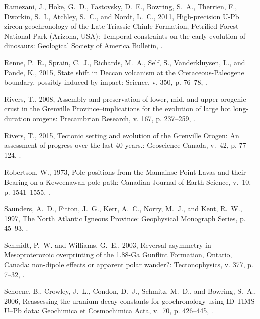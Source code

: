 \documentclass[11pt,letterpaper]{article}
\begin{document}
\begin{thebibliography}{153}
Ramezani, J., Hoke, G.~D., Fastovsky, D.~E., Bowring, S.~A., Therrien, F.,
  Dworkin, S.~I., Atchley, S.~C., and Nordt, L.~C., 2011, {High-precision U-Pb
  zircon geochronology of the Late Triassic Chinle Formation, Petrified Forest
  National Park (Arizona, USA): Temporal constraints on the early evolution of
  dinosaurs}: Geological Society of America Bulletin, .

Renne, P.~R., Sprain, C.~J., Richards, M.~A., Self, S., Vanderkluysen, L., and
  Pande, K., 2015, {State shift in Deccan volcanism at the Cretaceous-Paleogene
  boundary, possibly induced by impact}: Science, v. 350, p. 76--78,
  .

Rivers, T., 2008, Assembly and preservation of lower, mid, and upper orogenic
  crust in the {G}renville {P}rovince--implications for the evolution of large
  hot long-duration orogens: Precambrian Research, v. 167, p. 237--259,
  .

Rivers, T., 2015, Tectonic setting and evolution of the {G}renville {O}rogen:
  An assessment of progress over the last 40 years.: Geoscience Canada, v.~42,
  p. 77--124, .

Robertson, W., 1973, Pole positions from the {M}amainse {P}oint {L}avas and
  their {B}earing on a {K}eweenawan pole path: Canadian Journal of Earth
  Science, v.~10, p. 1541--1555, .

Saunders, A.~D., Fitton, J.~G., Kerr, A.~C., Norry, M.~J., and Kent, R.~W.,
  1997, {The North Atlantic Igneous Province}: Geophysical Monograph Series, p.
  45--93, .

Schmidt, P.~W. and Williams, G.~E., 2003, Reversal asymmetry in
  {Mesoproterozoic overprinting of the 1.88-Ga Gunflint Formation, Ontario,
  Canada}: non-dipole effects or apparent polar wander?: Tectonophysics, v.
  377, p. 7--32, .

Schoene, B., Crowley, J.~L., Condon, D.~J., Schmitz, M.~D., and Bowring, S.~A.,
  2006, {Reassessing the uranium decay constants for geochronology using
  ID-TIMS U--Pb data}: Geochimica et Cosmochimica Acta, v.~70, p. 426--445,
  .


\end{thebibliography}
\end{document}
